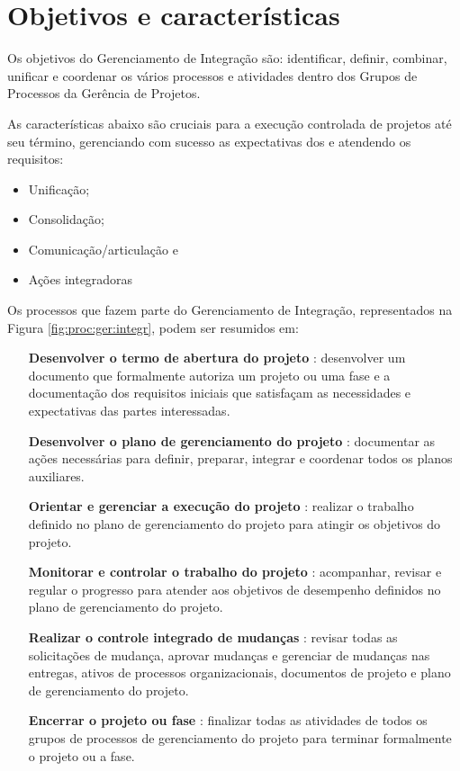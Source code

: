 
\chapter{Objetivos e características}

Os objetivos do Gerenciamento de Integração são: identificar, definir, combinar, unificar e coordenar os vários processos e atividades dentro dos Grupos de Processos da Gerência de Projetos.

As características abaixo são cruciais para a execução controlada de projetos até seu término, gerenciando com sucesso as expectativas dos \stake e atendendo os requisitos:

\begin{itemize}
	\item Unificação;
	\item Consolidação;
	\item Comunicação/articulação e 
	\item Ações integradoras
\end{itemize}

Os processos que fazem parte do Gerenciamento de Integração, representados na Figura \ref{fig:proc:ger:integr}, podem ser resumidos em:

\begin{itemize}

	\item[\textbf{Desenvolver o termo de abertura do projeto}]: desenvolver um documento que formalmente autoriza um projeto ou uma fase e a documentação dos requisitos iniciais que satisfaçam as necessidades e expectativas das partes interessadas.
	
	\item[\textbf{Desenvolver o plano de gerenciamento do projeto}]: documentar as ações necessárias para definir, preparar, integrar e coordenar todos os planos auxiliares. 
	
	\item[\textbf{Orientar e gerenciar a execução do projeto}]: realizar o trabalho definido no plano de gerenciamento do projeto para atingir os objetivos do	projeto. 
	
	\item[\textbf{Monitorar e controlar o trabalho do projeto}]: acompanhar, revisar e regular o progresso para atender aos objetivos de desempenho definidos no plano de gerenciamento do projeto.
	
	\item[\textbf{Realizar o controle integrado de mudanças}]: revisar todas as solicitações de mudança, aprovar mudanças e gerenciar de mudanças nas entregas, ativos de processos organizacionais, documentos de projeto e plano de gerenciamento do projeto.
	
	\item[\textbf{Encerrar o projeto ou fase}]: finalizar todas as atividades de todos os grupos de processos de gerenciamento do projeto para terminar formalmente o projeto ou a fase.
	
\end{itemize}

